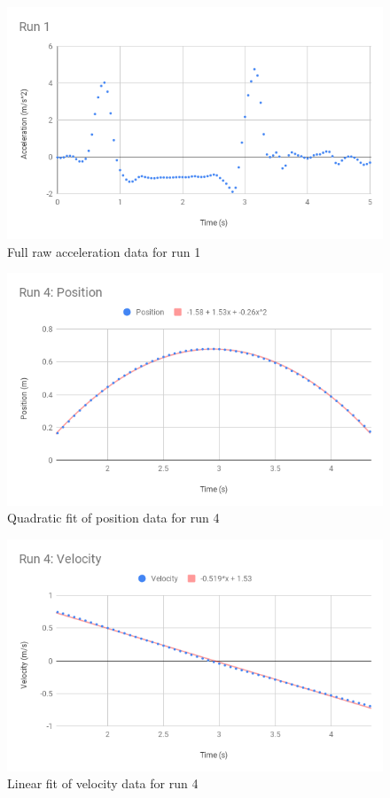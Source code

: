 \begin{figure}[ht]
    \centering
    \includegraphics[scale=0.71]{image/02-incline/Run1-a.png}
    \caption{Full raw acceleration data for run 1}
    \label{figure:02.raw.a}
\end{figure}
\begin{figure}[ht]
    \centering
    \includegraphics[scale=0.71]{image/02-incline/Run-4-d.png}
    \caption{Quadratic fit of position data for run 4}
    \label{figure:02.fit.d}
\end{figure}
\begin{figure}[ht]
    \centering
    \includegraphics[scale=0.71]{image/02-incline/Run-4-v.png}
    \caption{Linear fit of velocity data for run 4}
    \label{figure:02.fit.v}
\end{figure}
